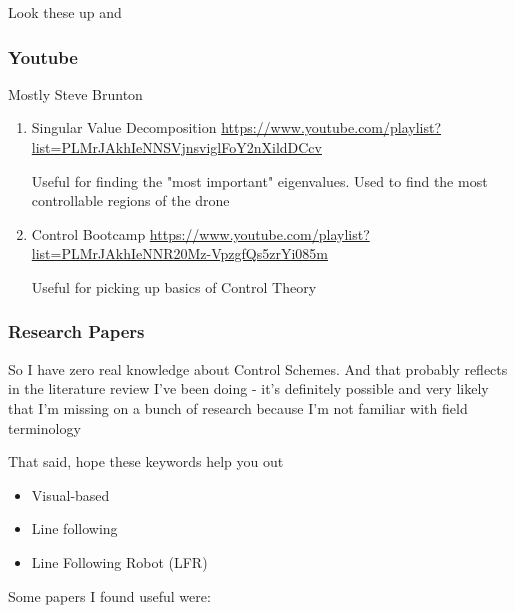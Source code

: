 \documentclass[unrestricted]{meetingnotesminutes}
\begin{document}
Look these up and

\subsubsection{Youtube}
\label{sec:org3ebd9af}

Mostly Steve Brunton

\begin{enumerate}
\item Singular Value Decomposition
\label{sec:orgf14eb09}
\url{https://www.youtube.com/playlist?list=PLMrJAkhIeNNSVjnsviglFoY2nXildDCcv}

Useful for finding the "most important" eigenvalues. Used to find the most controllable regions of the drone

\item Control Bootcamp
\label{sec:orgc6cf82b}
\url{https://www.youtube.com/playlist?list=PLMrJAkhIeNNR20Mz-VpzgfQs5zrYi085m}

Useful for picking up basics of Control Theory
\end{enumerate}

\subsubsection{Research Papers}
\label{sec:orgcbd2972}

So I have zero real knowledge about Control Schemes. And that probably reflects in the literature review I've been doing - it's definitely possible and very likely that I'm missing on a bunch of research because I'm not familiar with field terminology

That said, hope these keywords help you out
\begin{itemize}
\item Visual-based
\item Line following
\item Line Following Robot (LFR)
\end{itemize}

Some papers I found useful were:
\end{document}

